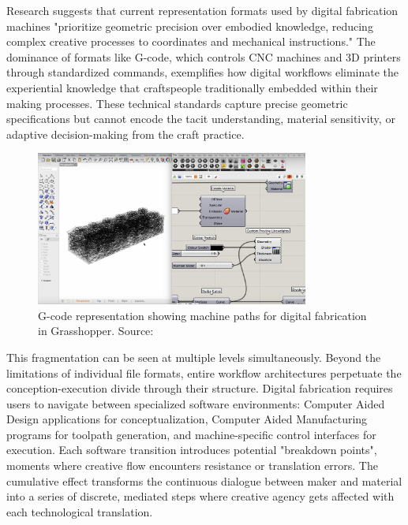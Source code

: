 \vspace{0.5cm}

Research suggests that current representation formats used by digital fabrication machines "prioritize geometric precision over embodied knowledge, reducing complex creative processes to coordinates and mechanical instructions." The dominance of formats like G-code, which controls CNC machines and 3D printers through standardized commands, exemplifies how digital workflows eliminate the experiential knowledge that craftspeople traditionally embedded within their making processes. These technical standards capture precise geometric specifications but cannot encode the tacit understanding, material sensitivity, or adaptive decision-making from the craft practice.

\begin{figure}[H]
\centering
\includegraphics[width=0.8\textwidth]{figures/chapter1/G-code.png}
\caption{G-code representation showing machine paths for digital fabrication in Grasshopper. Source: \cite{munoz_zanon_2024_youtube}}
\label{fig:gcode_representation}
\end{figure}

This fragmentation can be seen at multiple levels simultaneously. Beyond the limitations of individual file formats, entire workflow architectures perpetuate the conception-execution divide through their structure. Digital fabrication requires users to navigate between specialized software environments: Computer Aided Design applications for conceptualization, Computer Aided Manufacturing programs for toolpath generation, and machine-specific control interfaces for execution. Each software transition introduces potential "breakdown points", moments where creative flow encounters resistance or translation errors. The cumulative effect transforms the continuous dialogue between maker and material into a series of discrete, mediated steps where creative agency gets affected with each technological translation.

